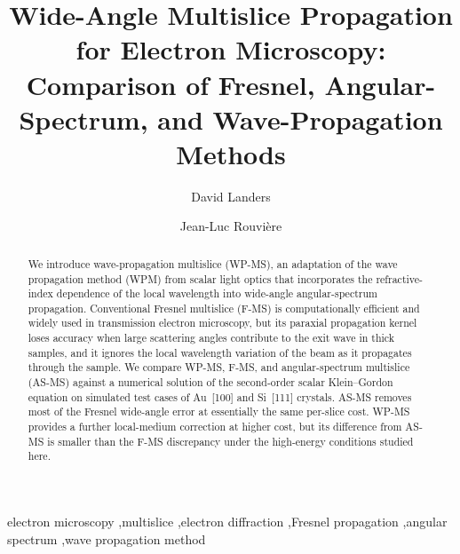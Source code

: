 \documentclass[preprint,12pt,number]{elsarticle}
\begin{document}
\begin{frontmatter}

\title{Wide-Angle Multislice Propagation for Electron Microscopy:
Comparison of Fresnel, Angular-Spectrum, and Wave-Propagation Methods}
\author[inst1]{David Landers}
\author[inst1]{Jean-Luc Rouvi\`ere}

\begin{abstract}
We introduce wave-propagation multislice (WP-MS), an adaptation of the wave propagation method (WPM) from scalar light optics that incorporates the refractive-index dependence of the local wavelength into wide-angle angular-spectrum propagation. Conventional Fresnel multislice (F-MS) is computationally efficient and widely used in transmission electron microscopy, but its paraxial propagation kernel loses accuracy when large scattering angles contribute to the exit wave in thick samples, and it ignores the local wavelength variation of the beam as it propagates through the sample. We compare WP-MS, F-MS, and angular-spectrum multislice (AS-MS) against a numerical solution of the second-order scalar Klein--Gordon equation on simulated test cases of Au~[100] and Si~[111] crystals. AS-MS removes most of the Fresnel wide-angle error at essentially the same per-slice cost. WP-MS provides a further local-medium correction at higher cost, but its difference from AS-MS is smaller than the F-MS discrepancy under the high-energy conditions studied here.

\end{abstract}

\begin{keyword}
electron microscopy \sep multislice \sep electron diffraction \sep Fresnel propagation \sep angular spectrum \sep wave propagation method
\end{keyword}

\end{frontmatter}
\end{document}
